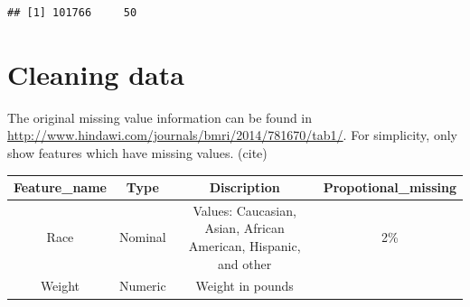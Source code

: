\documentclass[]{article}
\begin{document}
\begin{verbatim}
## [1] 101766     50
\end{verbatim}

\section{Cleaning data}\label{cleaning-data}

The original missing value information can be found in
\url{http://www.hindawi.com/journals/bmri/2014/781670/tab1/}. For
simplicity, only show features which have missing values. (cite)

\begin{longtable}[c]{@{}cccc@{}}
\toprule
\begin{minipage}[b]{0.20\columnwidth}\centering\strut
Feature\_name
\strut\end{minipage} &
\begin{minipage}[b]{0.09\columnwidth}\centering\strut
Type
\strut\end{minipage} &
\begin{minipage}[b]{0.35\columnwidth}\centering\strut
Discription
\strut\end{minipage} &
\begin{minipage}[b]{0.24\columnwidth}\centering\strut
Propotional\_missing
\strut\end{minipage}\tabularnewline
\midrule
\endhead
\begin{minipage}[t]{0.20\columnwidth}\centering\strut
Race
\strut\end{minipage} &
\begin{minipage}[t]{0.09\columnwidth}\centering\strut
Nominal
\strut\end{minipage} &
\begin{minipage}[t]{0.35\columnwidth}\centering\strut
Values: Caucasian, Asian, African American, Hispanic, and other
\strut\end{minipage} &
\begin{minipage}[t]{0.24\columnwidth}\centering\strut
2\%
\strut\end{minipage}\tabularnewline
\begin{minipage}[t]{0.20\columnwidth}\centering\strut
Weight
\strut\end{minipage} &
\begin{minipage}[t]{0.09\columnwidth}\centering\strut
Numeric
\strut\end{minipage} &
\begin{minipage}[t]{0.35\columnwidth}\centering\strut
Weight in pounds

\end{minipage}
\end{longtable}
\end{document}
